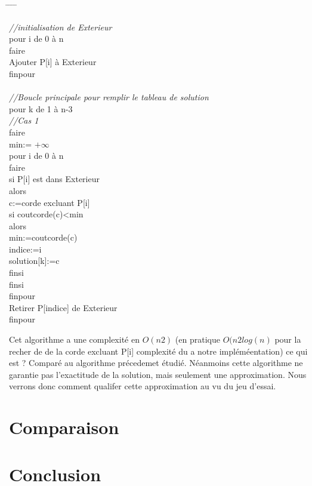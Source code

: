 \documentclass[a4paper,10pt]{article}
\begin{document}
\begin{tabbing}
\hspace{0.5cm} \= \hspace{0.5cm}  \= \hspace{0.5cm} \= \hspace{0.5cm} \= \kill
 
\textit{//initialisation de Exterieur}\\
pour i de 0 à n\\
faire\\
\> Ajouter P[i] à Exterieur\\
finpour\\
\\
\textit{//Boucle principale pour remplir le tableau de solution}\\
pour k de 1 à n-3\\\> \> \textit{//Cas 1} \\
faire\\
    \> min:= $+\infty$ \\ 
    \> pour i de 0 à n\\
    \> faire\\
        \> \> si P[i] est dans Exterieur\\
        \> \> alors\\
            \> \> \> c:=corde excluant P[i]\\
            \> \> \> si coutcorde(c)<min\\
            \> \> \> alors\\
                \> \> \> \> min:=coutcorde(c)\\
                \> \> \> \> indice:=i\\
                \> \> \> \> solution[k]:=c\\
            \> \> \> finsi\\
        \> \> finsi\\
    \> finpour\\
    \> Retirer P[indice] de Exterieur\\
finpour\\
\end{tabbing}

Cet algorithme a une complexité en $O(n2)$ (en pratique $O(n2log(n)$ pour la recher de de la corde excluant P[i] complexité du a notre impléméentation) ce qui est ? Comparé au algorithme précedemet étudié.
Néanmoins cette algorithme ne garantie pas l'exactitude de la solution, mais seulement une approximation.
Nous verrons donc comment qualifer cette approximation au vu du jeu d'essai.


\section{Comparaison}

\section{Conclusion}
\end{document}
